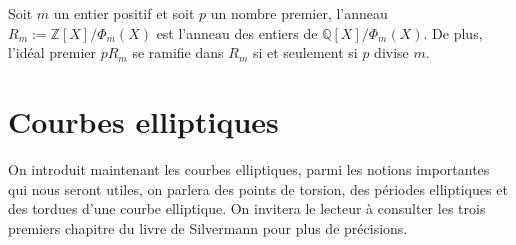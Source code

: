 \documentclass[a4paper]{article} %
\numberwithin{section}{part}
\numberwithin{equation}{section}
\newcommand\QQ{\mathbb{Q}}
\newcommand\ZZ{\mathbb{Z}}
\begin{document}
\begin{thm}
\label{th:entiercycl}
Soit $m$ un entier positif et soit $p$ un nombre premier, l'anneau $R_m := 
\ZZ[X]/\Phi_m(X)$ est l'anneau des entiers de $\QQ[X]/\Phi_m(X)$. De plus, 
l'idéal premier $pR_m$ se ramifie dans $R_m$ si et seulement si $p$ divise $m$.
\end{thm}
\section{Courbes elliptiques}
On introduit maintenant les courbes elliptiques, parmi les notions importantes 
qui nous seront utiles, on parlera des points de torsion, des périodes 
elliptiques et des tordues d'une courbe elliptique.  On invitera
le lecteur à consulter les trois premiers chapitre du livre de 
Silvermann \cite{Sil} pour plus de précisions.
\end{document}
